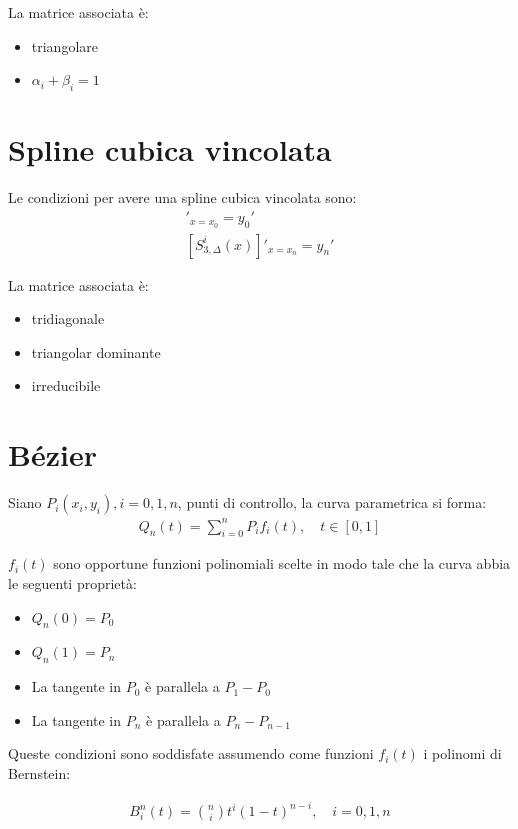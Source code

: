 La matrice associata è:
\begin{itemize}
  \item triangolare
  \item $\alpha_i + \beta_i = 1$
\end{itemize}


\section{Spline cubica vincolata}
Le condizioni per avere una spline cubica vincolata sono:
\begin{align}
  [S_{3, \Delta}^i(x)]'_{x=x_0} = y_0' \\
  [S_{3, \Delta}^i(x)]'_{x=x_n} = y_n'
\end{align}



La matrice associata è:
\begin{itemize}
  \item tridiagonale
  \item triangolar dominante
  \item irreducibile
\end{itemize}



\section{B\'ezier}

Siano $P_i(x_i, y_i), i = 0, 1, n$, punti di controllo, la curva parametrica si forma:
\begin{align}
  Q_n(t) = \sum_{i=0}^n P_i f_i(t), \quad t \in [0, 1]
\end{align}

$f_i(t)$ sono opportune funzioni polinomiali scelte in modo tale che la curva abbia le seguenti proprietà:

\begin{itemize}
  \item $Q_n(0) = P_0$
  \item $Q_n(1) = P_n$
  \item La tangente in $P_0$ \`e parallela a $P_1 - P_0$
  \item La tangente in $P_n$ \`e parallela a $P_n - P_{n-1}$
\end{itemize}


Queste condizioni sono soddisfate assumendo come funzioni $f_i(t)$ i polinomi di Bernstein:

\begin{align}
  B_i^n(t) = \binom{n}{i} t^i (1-t)^{n-i}, \quad i = 0, 1, n
\end{align}

